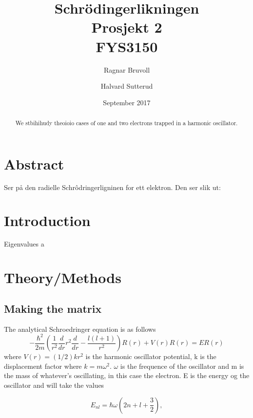 \documentclass[12pt]{article}
\begin{document}
\title{Schrödingerlikningen
\\ Prosjekt 2
\\ FYS3150}
\author{Ragnar Bruvoll \and Halvard Sutterud}
\date{September 2017}
\maketitle{\begin{center}\end{center}}
\thispagestyle{empty}

\begin{abstract}
    We stbihihudy theoioio cases of one and two electrons trapped in a harmonic oscillator. 

\end{abstract}
\newpage
{}


\section*{Abstract}
Ser på den radielle Schrôdringerligninen for ett elektron. Den ser slik ut:


\section*{Introduction}
Eigenvalues a


\section*{Theory/Methods}
\subsection*{Making the matrix}
The analytical Schroedringer equation is as follows
\begin{equation*}
  -\frac{\hbar^2}{2 m} \left ( \frac{1}{r^2} \frac{d}{dr} r^2
  \frac{d}{dr} - \frac{l (l + 1)}{r^2} \right )R(r) 
     + V(r) R(r) = E R(r)
\end{equation*}
where  $V(r) = (1/2)kr^2$ is the harmonic oscillator potential, k is the displacement factor where $k=m\omega^2$.
$\omega$ is the frequence of the oscillator and m is the mass of whatever's oscillating, in this case the electron. E is the energy og the oscillator and will take the values

\begin{equation*}
E_{nl}=  \hbar \omega \left(2n+l+\frac{3}{2}\right),
\end{equation*}
\end{document}

